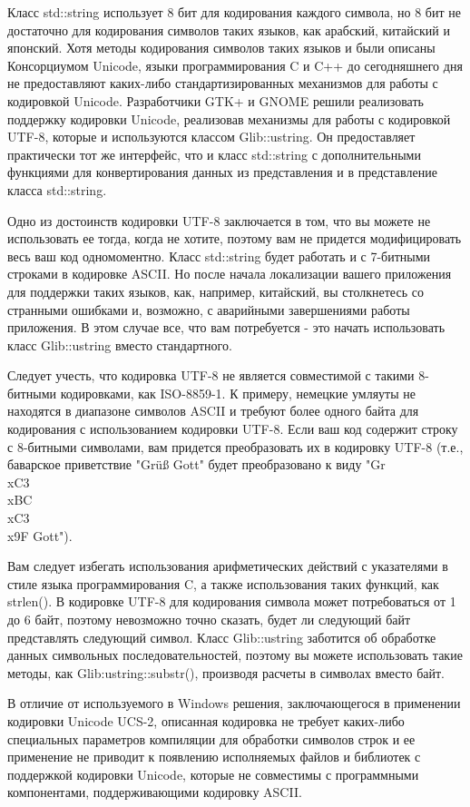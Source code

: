Класс std::string использует 8 бит для кодирования каждого символа, но 8 бит не достаточно для кодирования символов таких языков, как арабский, китайский и японский. Хотя методы кодирования символов таких языков и были описаны Консорциумом Unicode, языки программирования C и C++ до сегодняшнего дня не предоставляют каких-либо стандартизированных механизмов для работы с кодировкой Unicode. Разработчики GTK+ и GNOME решили реализовать поддержку кодировки Unicode, реализовав механизмы для работы с кодировкой UTF-8, которые и используются классом Glib::ustring. Он предоставляет практически тот же интерфейс, что и класс std::string с дополнительными функциями для конвертирования данных из представления и в представление класса std::string.

Одно из достоинств кодировки UTF-8 заключается в том, что вы можете не использовать ее тогда, когда не хотите, поэтому вам не придется модифицировать весь ваш код одномоментно. Класс std::string будет работать и с 7-битными строками в кодировке ASCII. Но после начала локализации вашего приложения для поддержки таких языков, как, например, китайский, вы столкнетесь со странными ошибками и, возможно, с аварийными завершениями работы приложения. В этом случае все, что вам потребуется - это начать использовать класс Glib::ustring вместо стандартного.

Следует учесть, что кодировка UTF-8 не является совместимой с такими 8-битными кодировками, как ISO-8859-1. К примеру, немецкие умляуты не находятся в диапазоне символов ASCII и требуют более одного байта для кодирования с использованием кодировки UTF-8. Если ваш код содержит строку с 8-битными символами, вам придется преобразовать их в кодировку UTF-8 (т.е., баварское приветствие "Grüß Gott" будет преобразовано к виду "Gr\\xC3\\xBC\\xC3\\x9F Gott").

Вам следует избегать использования арифметических действий с указателями в стиле языка программирования C, а также использования таких функций, как strlen(). В кодировке UTF-8 для кодирования символа может потребоваться от 1 до 6 байт, поэтому невозможно точно сказать, будет ли следующий байт представлять следующий символ. Класс Glib::ustring заботится об обработке данных символьных последовательностей, поэтому вы можете использовать такие методы, как Glib:ustring::substr(), производя расчеты в символах вместо байт.

В отличие от используемого в Windows решения, заключающегося в применении кодировки Unicode UCS-2, описанная кодировка не требует каких-либо специальных параметров компиляции для обработки символов строк и ее применение не приводит к появлению исполняемых файлов и библиотек с поддержкой кодировки Unicode, которые не совместимы с программными компонентами, поддерживающими кодировку ASCII.

